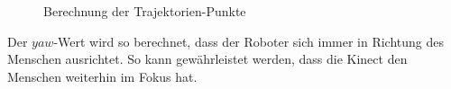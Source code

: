 \begin{figure}
	\center
	
	\caption{Berechnung der Trajektorien-Punkte}
	\label{fig:trajektorie}
\end{figure}

Der $yaw$-Wert wird so berechnet, dass der Roboter sich immer in Richtung des Menschen ausrichtet.
So kann gewährleistet werden, dass die Kinect den Menschen weiterhin im Fokus hat.





